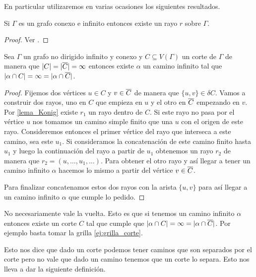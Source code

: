 \documentclass[tesis.tex]{subfiles}
\begin{document}
En particular utilizaremos en varias ocasiones los siguientes resultados.


\begin{lema}[König]\label{lema_Konig}
	Si $\Gamma$ es un grafo conexo e infinito entonces existe un rayo $r$ sobre $\Gamma$.
\end{lema}
\begin{proof}
	Ver \cite[p.215]{diestel2005graph}.
\end{proof}


\begin{lema}\label{lema_camino_infinito_cortado}
	Sea $\Gamma$ un grafo no dirigido infinito y conexo y $C \subseteq V(\Gamma)$ un corte de $\Gamma$ de manera que $|C| = |\overline C| = \infty$ entonces existe $\alpha$ un camino infinito tal que 
	$|\alpha \cap C| = \infty = |\alpha \cap \overline C|$.
\end{lema}

\begin{proof}
	Fijemos dos vértices $u \in C$ y $v \in \overline C$ de manera que $\{u,v\} \in \delta C$.
	Vamos a construir dos rayos, uno en $C$ que empieza en $u$ y el otro en $\overline C$ empezando en $v$.
	Por \ref{lema_Konig} existe $r_{1}$ un rayo dentro de $C$.
	Si este rayo no pasa por el vértice $u$ nos tomamos un camino simple finito que una $u$ con el origen de este rayo.
	Consideremos entonces el primer vértice del rayo que interseca a este camino, sea este $u_{1}$.
	Si consideramos la concatenación de este camino finito hasta $u_{1}$ y luego la continuación del rayo a partir de $u_{1}$ obtenemos 
	un rayo $r_{2}$ de manera que $r_{2} = (u, \dots, u_{1}, \dots)$.
	Para obtener el otro rayo y así llegar a tener un camino infinito $\alpha$ hacemos lo mismo a partir del vértice $v \in \overline C$. 
	
	Para finalizar concatenamos estos dos rayos con la arista $\{u,v\}$ para así llegar a un camino infinito $\alpha$ que cumple lo pedido. 
	
\end{proof}


No necesariamente vale la vuelta.
Esto es que si tenemos un camino infinito $\alpha$ entonces existe un corte $C$ tal que cumple que $|\alpha \cap C| = \infty = |\alpha \cap \overline C|$.
Por ejemplo basta tomar la grilla \ref{ej:grilla_corte}.

Esto nos dice que dado un corte podemos tener caminos que son separados por el corte pero no vale que dado un camino tenemos que un corte lo separa.
Esto nos lleva a dar la siguiente definición.
\end{document}
